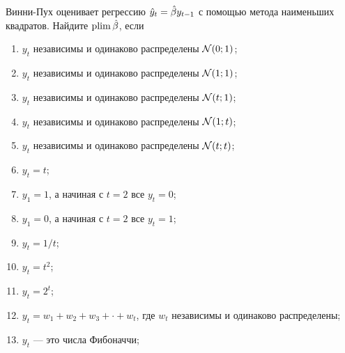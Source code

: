 \begin{problem}
	Винни-Пух оценивает регрессию $\hat{y}_t = \hat{\beta} y_{t-1}$ с помощью метода наименьших квадратов.
	Найдите $\operatorname*{plim} \hat{\beta}$, если
\begin{enumerate}
	\item $y_t$ независимы и одинаково распределены $\mathcal{N}(0; 1)$;
	\item $y_t$ независимы и одинаково распределены $\mathcal{N}(1; 1)$;
	\item $y_t$ независимы и одинаково распределены $\mathcal{N}(t; 1)$;
	\item $y_t$ независимы и одинаково распределены $\mathcal{N}(1; t)$;
	\item $y_t$ независимы и одинаково распределены $\mathcal{N}(t; t)$;
	\item $y_t = t$;
	\item $y_1 = 1$, а начиная с $t=2$ все $y_t=0$;
	\item $y_1 = 0$, а начиная с $t=2$ все $y_t=1$;
	\item $y_t = 1/t$;
	\item $y_t = t^2$;
	\item $y_t= 2^t$;
	\item $y_t = w_1 + w_2 + w_3 + \cdot + w_t$, где $w_t$ независимы и одинаково распределены;
	\item $y_t$ — это числа Фибоначчи;
\end{enumerate}

\begin{sol}
\end{sol}
\end{problem}



